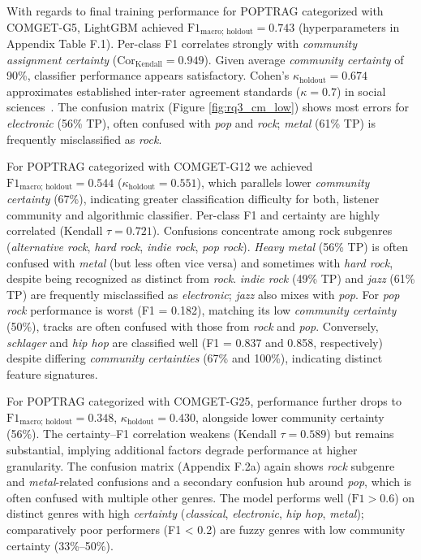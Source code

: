 \documentclass{article}
\begin{document}
With regards to final training performance for POPTRAG categorized with COMGET-G5, LightGBM achieved $\text{F1}_{\text{macro; holdout}} = 0.743$ (hyperparameters in Appendix Table F.1). Per-class F1 correlates strongly with \textit{community assignment certainty} ($\text{Cor}_{\text{Kendall}} = 0.949$). Given average \textit{community certainty} of 90\%, classifier performance appears satisfactory. Cohen's $\kappa_{\text{holdout}} = 0.674$ approximates established inter-rater agreement standards ($\kappa = 0.7$) in social sciences~\citep[p. 327]{hildebrandtInhaltsanalyse2015}. The confusion matrix (Figure \ref{fig:rq3_cm_low}) shows most errors for \textit{electronic} (56\% TP), often confused with \textit{pop} and \textit{rock}; \textit{metal} (61\% TP) is frequently misclassified as \textit{rock}.

For POPTRAG categorized with COMGET-G12 we achieved $\text{F1}_{\text{macro; holdout}} = 0.544$ ($\kappa_{\text{holdout}} = 0.551$), which parallels lower \textit{community certainty} (67\%), indicating greater classification difficulty for both, listener community and algorithmic classifier. Per-class F1 and certainty are highly correlated (Kendall $\tau = 0.721$). Confusions concentrate among rock subgenres (\textit{alternative rock}, \textit{hard rock}, \textit{indie rock}, \textit{pop rock}). \textit{Heavy metal} (56\% TP) is often confused with \textit{metal} (but less often vice versa) and sometimes with \textit{hard rock}, despite being recognized as distinct from \textit{rock}. \textit{indie rock} (49\% TP) and \textit{jazz} (61\% TP) are frequently misclassified as \textit{electronic}; \textit{jazz} also mixes with \textit{pop}. For \textit{pop rock} performance is worst (F1 = 0.182), matching its low \textit{community certainty} (50\%), tracks are often confused with those from \textit{rock} and \textit{pop}. Conversely, \textit{schlager} and \textit{hip hop} are classified well (F1 = 0.837 and 0.858, respectively) despite differing \textit{community certainties} (67\% and 100\%), indicating distinct feature signatures.

For POPTRAG categorized with COMGET-G25, performance further drops to $\text{F1}_{\text{macro; holdout}} = 0.348$, $\kappa_{\text{holdout}} = 0.430$, alongside lower community certainty (56\%). The certainty–F1 correlation weakens (Kendall $\tau = 0.589$) but remains substantial, implying additional factors degrade performance at higher granularity. The confusion matrix (Appendix F.2a) again shows \textit{rock} subgenre and \textit{metal}-related confusions and a secondary confusion hub around \textit{pop}, which is often confused with multiple other genres. The model performs well ($\text{F1} > 0.6$) on distinct genres with high \textit{certainty} (\textit{classical}, \textit{electronic}, \textit{hip hop}, \textit{metal}); comparatively poor performers (F1 < 0.2) are fuzzy genres with low community certainty (33\%–50\%).
\end{document}
